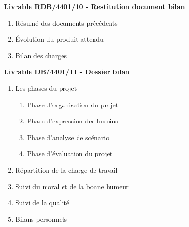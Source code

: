 \bf{Livrable RDB/4401/10 - Restitution document bilan} \\

\begin{enumerate}
    \item Résumé des documents précédents
    \item Évolution du produit attendu
    \item Bilan des charges \\
\end{enumerate}

\bf{Livrable DB/4401/11 - Dossier bilan} \\

\begin{enumerate}
    \item Les phases du projet
        \begin{enumerate}
            \item Phase d’organisation du projet
            \item Phase d’expression des besoins
            \item Phase d’analyse de scénario
            \item Phase d’évaluation du projet
        \end{enumerate}
    \item Répartition de la charge de travail
    \item Suivi du moral et de la bonne humeur
    \item Suivi de la qualité
    \item Bilans personnels 
\end{enumerate}
